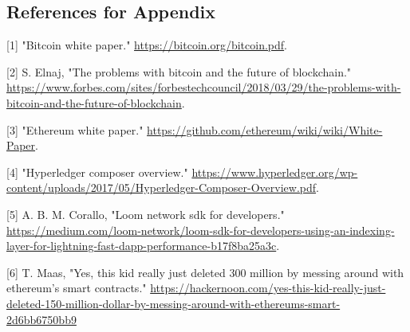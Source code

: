\documentclass[12pt]{scrreprt}
\begin{document}
\begin{appendices}
\newpage 


\section*{References for Appendix}

\hfill \break 


\leavevmode\hypertarget{ref-bitcoinWhitePaper:Online}{}%
{[}1{]} "Bitcoin white paper." \url{https://bitcoin.org/bitcoin.pdf}.

\leavevmode\hypertarget{ref-bitCoinProblems:Online}{}%
{[}2{]} S. Elnaj, "The problems with bitcoin and the future of
blockchain."
\url{https://www.forbes.com/sites/forbestechcouncil/2018/03/29/the-problems-with-bitcoin-and-the-future-of-blockchain}.

\leavevmode\hypertarget{ref-ethereumWhitePaper:Online}{}%
{[}3{]} "Ethereum white paper."
\url{https://github.com/ethereum/wiki/wiki/White-Paper}.

\leavevmode\hypertarget{ref-hyperledgerComposer:Online}{}%
{[}4{]} "Hyperledger composer overview."
\url{https://www.hyperledger.org/wp-content/uploads/2017/05/Hyperledger-Composer-Overview.pdf}.

\leavevmode\hypertarget{ref-loomNetwork:Online}{}%
{[}5{]} A. B. M. Corallo, "Loom network sdk for developers."
\url{https://medium.com/loom-network/loom-sdk-for-developers-using-an-indexing-layer-for-lightning-fast-dapp-performance-b17f8ba25a3c}.

\leavevmode\hypertarget{ref-funnyJoke:Online}{}%
{[}6{]} T. Maas, "Yes, this kid really just deleted 300 million by
messing around with ethereum's smart contracts."
\url{https://hackernoon.com/yes-this-kid-really-just-deleted-150-million-dollar-by-messing-around-with-ethereums-smart-2d6bb6750bb9}

\end{appendices}
\end{document}
